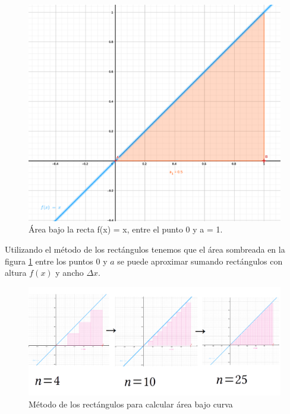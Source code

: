 \documentclass[
]{book}
\begin{document}
\begin{figure}

{\centering \includegraphics{Unidad-III/Area-bajo-recta} 

}

\caption{Área bajo la recta f(x) = x, entre el punto 0 y a = 1.}\label{fig:Area-recta}
\end{figure}

Utilizando el método de los rectángulos tenemos que el área sombreada en la figura \ref{fig:Area-recta} entre los puntos \(0\) y \(a\) se puede aproximar sumando rectángulos con altura \(f(x)\) y ancho \(\Delta x\).

\begin{figure}

{\centering \includegraphics{Unidad-III/Rectangulos} 

}

\caption{Método de los rectángulos para calcular área bajo curva}\label{fig:Recta-area-rect}
\end{figure}
\end{document}
